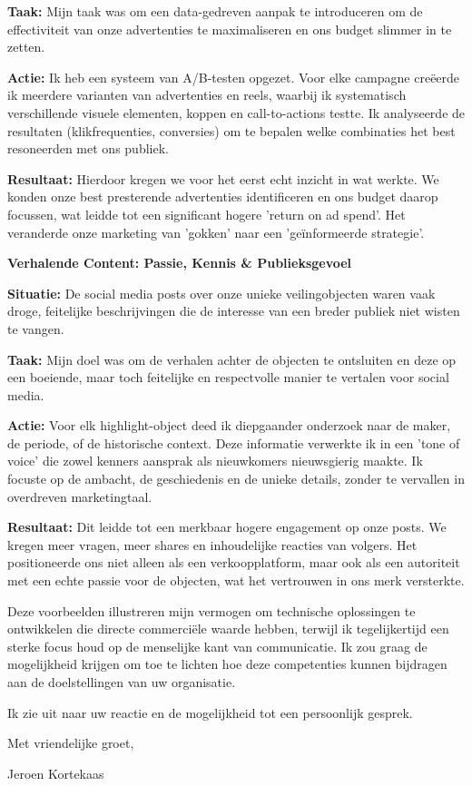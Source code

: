 \documentclass[11pt,a4paper]{article}
\begin{document}
\textbf{Taak:} Mijn taak was om een data-gedreven aanpak te introduceren om de effectiviteit van onze advertenties te maximaliseren en ons budget slimmer in te zetten.

\textbf{Actie:} Ik heb een systeem van A/B-testen opgezet. Voor elke campagne creëerde ik meerdere varianten van advertenties en reels, waarbij ik systematisch verschillende visuele elementen, koppen en call-to-actions testte. Ik analyseerde de resultaten (klikfrequenties, conversies) om te bepalen welke combinaties het best resoneerden met ons publiek.

\textbf{Resultaat:} Hierdoor kregen we voor het eerst echt inzicht in wat werkte. We konden onze best presterende advertenties identificeren en ons budget daarop focussen, wat leidde tot een significant hogere 'return on ad spend'. Het veranderde onze marketing van 'gokken' naar een 'geïnformeerde strategie'.

\newpage

\textbf{Verhalende Content: Passie, Kennis \& Publieksgevoel}

\textbf{Situatie:} De social media posts over onze unieke veilingobjecten waren vaak droge, feitelijke beschrijvingen die de interesse van een breder publiek niet wisten te vangen.

\textbf{Taak:} Mijn doel was om de verhalen achter de objecten te ontsluiten en deze op een boeiende, maar toch feitelijke en respectvolle manier te vertalen voor social media.

\textbf{Actie:} Voor elk highlight-object deed ik diepgaander onderzoek naar de maker, de periode, of de historische context. Deze informatie verwerkte ik in een 'tone of voice' die zowel kenners aansprak als nieuwkomers nieuwsgierig maakte. Ik focuste op de ambacht, de geschiedenis en de unieke details, zonder te vervallen in overdreven marketingtaal.

\textbf{Resultaat:} Dit leidde tot een merkbaar hogere engagement op onze posts. We kregen meer vragen, meer shares en inhoudelijke reacties van volgers. Het positioneerde ons niet alleen als een verkoopplatform, maar ook als een autoriteit met een echte passie voor de objecten, wat het vertrouwen in ons merk versterkte.

\vspace{2em}

Deze voorbeelden illustreren mijn vermogen om technische oplossingen te ontwikkelen die directe commerciële waarde hebben, terwijl ik tegelijkertijd een sterke focus houd op de menselijke kant van communicatie. Ik zou graag de mogelijkheid krijgen om toe te lichten hoe deze competenties kunnen bijdragen aan de doelstellingen van uw organisatie.

Ik zie uit naar uw reactie en de mogelijkheid tot een persoonlijk gesprek.

\vspace{2em}

Met vriendelijke groet,

\vspace{3em}

Jeroen Kortekaas
\end{document}

